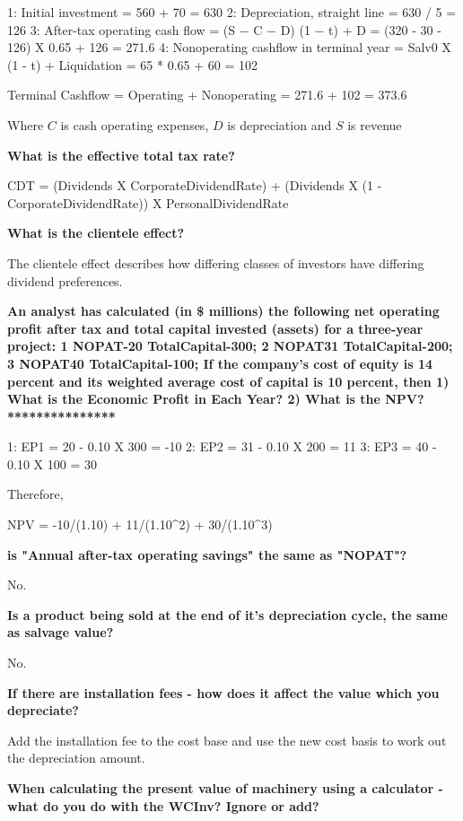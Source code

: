 \documentclass[12pt]{article}
\begin{document}
\begin{framed}
{			1: Initial investment = 560 + 70 = 630
			2: Depreciation, straight line = 630 / 5 = 126
			3: After-tax operating cash flow = (S − C − D) (1 − t) + D = (320 - 30 - 126) X 0.65 + 126 = 271.6
			4: Nonoperating cashflow in terminal year = Salv0 X (1 - t)  + Liquidation = 65 * 0.65 + 60 = 102
			
			Terminal Cashflow = Operating + Nonoperating = 271.6 + 102 = 373.6
			
			Where $C$ is cash operating expenses, $D$ is depreciation and $S$ is revenue 
			
				\textbf{What is the effective total tax rate?}
			
			CDT = (Dividends X CorporateDividendRate) + (Dividends X (1 - CorporateDividendRate)) X PersonalDividendRate
			
			\textbf{What is the clientele effect?}
			
			The clientele effect describes how differing classes of investors have differing dividend preferences. 
			
			\textbf{An analyst has calculated (in \$ millions) the following net operating profit after tax and total capital invested (assets) for a three-year project: 1	NOPAT-20	TotalCapital-300; 2	NOPAT31	TotalCapital-200; 3	NOPAT40	TotalCapital-100; If the company's cost of equity is 14 percent and its weighted average cost of capital is 10 percent, then 1) What is the Economic Profit in Each Year? 2) What is the NPV? ***************}
			
			1: EP1 = 20 - 0.10 X 300 = -10
			2: EP2 = 31 - 0.10 X 200 = 11
			3: EP3 = 40 - 0.10 X 100 = 30 
			
			Therefore, 
			
			NPV = -10/(1.10) + 11/(1.10^2) + 30/(1.10^3)
			
			\textbf{is "Annual after-tax operating savings" the same as "NOPAT"?}
			
			No.
			
			\textbf{Is a product being sold at the end of it's depreciation cycle, the same as salvage value?}
			
			No.
			
			\textbf{If there are installation fees - how does it affect the value which you depreciate?}
			
			Add the installation fee to the cost base and use the new cost basis to work out the depreciation amount.
			
			\textbf{When calculating the present value of machinery using a calculator - what do you do with the WCInv? Ignore or add?}
			
}
\end{framed}
\end{document}
